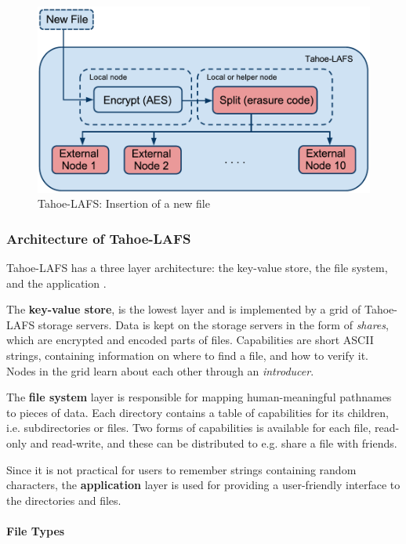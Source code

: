 \documentclass[pdftex,english,10pt,b5paper,twoside]{book}
\begin{document}
\begin{figure}[h!]
    \centering
    \includegraphics[width=\columnwidth]{Tahoe-newfile.pdf}
    \caption{Tahoe-LAFS: Insertion of a new file}
    \label{fig:B:tahoe}
\end{figure}


\subsubsection{Architecture of Tahoe-LAFS}

Tahoe-\ac{LAFS} has a three layer architecture: the key-value store, the file system, and
the application \cite{tahoe}.

The \textbf{key-value store}, is the lowest layer and is implemented by a grid
of Tahoe-LAFS storage servers. Data is kept on the storage servers in the form
of \emph{shares}, which are encrypted and encoded parts of files. Capabilities
are short ASCII strings, containing information on where to find a file, and
how to verify it.  Nodes in the grid learn about each other through an
\emph{introducer}.

The \textbf{file system} layer is responsible for mapping human-meaningful
pathnames to pieces of data. Each directory contains a table of capabilities
for its children, i.e. subdirectories or files. Two forms of capabilities is
available for each file, read-only and read-write, and these can be distributed
to e.g. share a file with friends.

Since it is not practical for users to remember strings containing random
characters, the \textbf{application} layer is used for providing a user-friendly
interface to the directories and files.

\paragraph{File Types}
\end{document}

